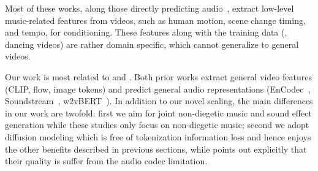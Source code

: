 Most of these works, along those directly predicting audio~\citep{Zhu2022QuantizedGF}, extract low-level music-related features from videos, such as human motion, scene change timing, and tempo, for conditioning. These features along with the training data (\eg, dancing videos) are rather domain specific, which cannot generalize to general videos.

Our work is most related to \citet{Su2023V2MeowMT} and \citet{Tian2024VidMuseAS}. Both prior works extract general video features (CLIP, flow, image tokens) and predict general audio representations (EnCodec~\citep{Defossez2022HighFN}, Soundstream~\citep{Zeghidour2022SoundStreamAE}, w2vBERT~\citep{Chung2021w2vBERTCC}). In addition to our novel scaling, the main differences in our work are twofold: first we aim for joint non-diegetic music and sound effect generation while these studies only focus on non-diegetic music; second we adopt diffusion modeling which is free of tokenization information loss and hence enjoys the other benefits described in previous sections, while \citet{Tian2024VidMuseAS} points out explicitly that their quality is suffer from the audio codec limitation.
